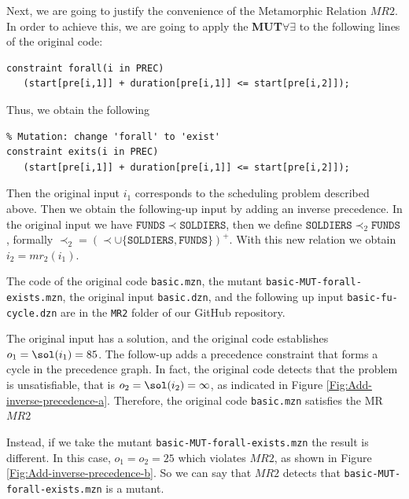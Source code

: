 Next, we are going to justify the convenience of the Metamorphic Relation
$MR2$. In order to achieve this, we are going to apply the
\textbf{MUT$\forall\exists$} to the following lines of the original code:

\begin{lstlisting}
constraint forall(i in PREC)
   (start[pre[i,1]] + duration[pre[i,1]] <= start[pre[i,2]]);
\end{lstlisting}

Thus, we obtain the following


\begin{lstlisting}
% Mutation: change 'forall' to 'exist'
constraint exits(i in PREC)
   (start[pre[i,1]] + duration[pre[i,1]] <= start[pre[i,2]]);
\end{lstlisting}

Then the original input $i_{1}$ corresponds to the scheduling problem
described above. Then we obtain the following-up input by adding an
inverse precedence. In the original input we have $\mathtt{FUNDS}\prec
\mathtt{SOLDIERS}$, then we define
$\mathtt{SOLDIERS}\prec_{2}\mathtt{FUNDS}$, formally
$\prec_{2}=(\prec\cup\{\mathtt{SOLDIERS},\mathtt{FUNDS}\})^{+}$. With
this new relation we obtain $i_{2}=mr_{2}(i_{1})$.

The code of the original code \lstinline{basic.mzn}, the mutant
\lstinline{basic-MUT-forall-exists.mzn}, the original input
\lstinline|basic.dzn|, and the following up input
\lstinline{basic-fu-cycle.dzn} are in the \texttt{MR2} folder of our
GitHub repository.

The original input has a solution, and the original
code establishes $o_{1}=\sol(i_{1})=85$. The follow-up adds a precedence constraint that forms a cycle in the
precedence graph. In fact, the original code detects that the problem
is unsatisfiable, that is $o_{2}=\sol(i_{2})=\infty$, as indicated in Figure
\ref{Fig:Add-inverse-precedence-a}. Therefore, the original code
\lstinline|basic.mzn| satisfies the MR
$MR2$

Instead, if we take the mutant \lstinline|basic-MUT-forall-exists.mzn|
the result is different. In this case, $o_{1}=o_{2}=25$ which violates $MR2$, as shown in
Figure \ref{Fig:Add-inverse-precedence-b}. So we can say that $MR2$
detects that \lstinline{basic-MUT-forall-exists.mzn} is a mutant.


